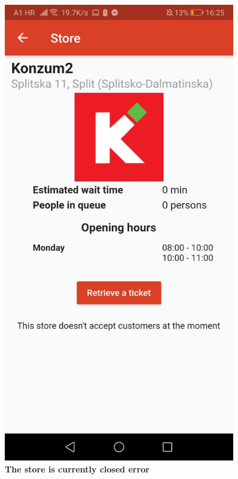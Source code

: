 \begin{figure}[!htb]
\begin{minipage}{0.45\textwidth}
\centering
\includegraphics[width=0.9\textwidth]{Images/ClosedStore}
\captionsetup{justification=centering}
\caption{\label{fig:appandroiderr2}\textbf{The store is currently closed error}}
\end{minipage}
\end{figure}


